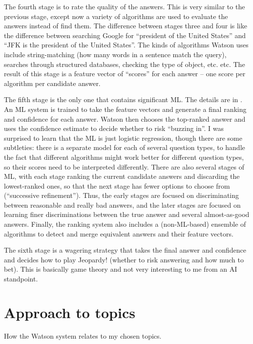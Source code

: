 \documentclass[10pt,a4paper]{article}
\newcommand{\nquote}[1]{``{#1}''}
\begin{document}
The fourth stage is to rate the quality of the answers. This is very similar to the previous stage, except now a variety of algorithms are used to evaluate the answers instead of find them. The difference between stages three and four is like the difference between searching Google for \nquote{president of the United States} and \nquote{JFK is the president of the United States}. The kinds of algorithms Watson uses include string-matching (how many words in a sentence match the query), searches through structured databases, checking the type of object, etc. etc. The result of this stage is a feature vector of \nquote{scores} for each answer -- one score per algorithm per candidate answer.

The fifth stage is the only one that contains significant ML. The details are in \cite{watsonranking}. An ML system is trained to take the feature vectors and generate a final ranking and confidence for each answer. Watson then chooses the top-ranked answer and uses the confidence estimate to decide whether to risk \nquote{buzzing in}. I was surprised to learn that the ML is just logistic regression, though there are some subtleties: there is a separate model for each of several question types, to handle the fact that different algorithms might work better for different question types, so their scores need to be interpreted differently. There are also several stages of ML, with each stage ranking the current candidate answers and discarding the lowest-ranked ones, so that the next stage has fewer options to choose from (\nquote{successive refinement}). Thus, the early stages are focused on discriminating between reasonable and really bad answers, and the later stages are focused on learning finer discriminations between the true answer and several almost-as-good answers. Finally, the ranking system also includes a (non-ML-based) ensemble of algorithms to detect and merge equivalent answers and their feature vectors.

The sixth stage is a wagering strategy \cite{watsonwagering} that takes the final answer and confidence and decides how to play Jeopardy! (whether to risk answering and how much to bet). This is basically game theory and not very interesting to me from an AI standpoint.

\section{Approach to topics}
How the Watson system relates to my chosen topics.
\end{document}
